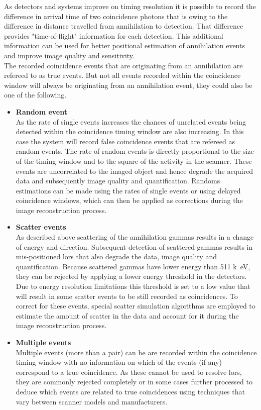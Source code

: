 As detectors and systems improve on timing resolution it is possible to record the difference in arrival time of two coincidence photons that is owing to the difference in distance travelled from annihilation to detection. That difference provides "time-of-flight" information for each detection. This additional information can be used for better positional estimation of annihilation events and improve image quality and sensitivity.  \\

The recorded coincidence events that are originating from an annihilation are refereed to as true events. But not all events recorded within the coincidence window will always be originating from an annihilation event, they could also be one of the following. 

\begin{itemize}

\item\textbf{Random event}\\
As the rate of single events increases the chances of unrelated events being detected within the coincidence timing window are also increasing. In this case the system will record false coincidence events that are refereed as random events. 
The rate of random events is directly proportional to the size of the timing window and to the square of the activity in the scanner. These events are uncorrelated to the imaged object and hence degrade the acquired data and subsequently image quality and quantification.  
Randoms estimations can be made using the rates of single events or using delayed coincidence windows, which can then be applied as corrections during the image reconstruction process. 

\item\textbf{Scatter events}\\
As described above scattering of the annihilation gammas results in a change of energy and direction. Subsequent detection of scattered gammas results in mis-positioned \glspl{lor} that also degrade the data, image quality and quantification. 
Because scattered gammas have lower energy than 511 \si{k\electronvolt}, they can be rejected by applying a lower energy threshold in the detectors. Due to energy resolution limitations this threshold is set to a low value that will result in some scatter events to be still recorded as coincidences. 
To correct for these events, special scatter simulation algorithms are employed to estimate the amount of scatter in the data and account for it during the image reconstruction process. 

\item\textbf{Multiple events}\\
Multiple events (more than a pair) can be are recorded within the coincidence timing window with no information on which of the events (if any) correspond to a true coincidence. As these cannot be used to resolve \glspl{lor}, they are commonly rejected completely or in some cases further processed to deduce which events are related to true coincidences using techniques that vary between scanner models and manufacturers. 

\end{itemize}

